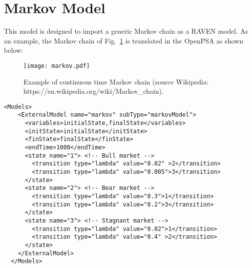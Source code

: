 \section{Markov Model}
\label{sec:MarkovModel}

This model is designed to import a generic Markov chain as a RAVEN model.
As an example, the Markov chain of Fig.~\ref{fig:markov} is translated in the OpenPSA as shown below:

\begin{figure}
    \centering
    \centerline{\texttt{[image: markov.pdf]}} 
    \caption{Example of continuous time Markov chain (source Wikipedia: https://en.wikipedia.org/wiki/Markov\_chain).}
    \label{fig:markov}
\end{figure}

\begin{lstlisting}[style=XML,morekeywords={anAttribute},caption=Markov model input example., label=lst:Markov_InputExample]
  <Models>
    <ExternalModel name="markov" subType="markovModel">
      <variables>initialState,finalState</variables>
      <initState>initialState</initState>
      <finState>finalState</finState>
      <endTime>1000</endTime>
      <state name="1"> <!-- Bull market -->
        <transition type="lambda" value="0.02" >2</transition>
        <transition type="lambda" value="0.005">3</transition>
      </state>
      <state name="2"> <!-- Bear market -->
        <transition type="lambda" value="0.3">1</transition>
        <transition type="lambda" value="0.2">3</transition>
      </state>
      <state name="3"> <!-- Stagnant market -->
        <transition type="lambda" value="0.02">1</transition>
        <transition type="lambda" value="0.4" >2</transition>
      </state>      
    </ExternalModel>
  </Models>
\end{lstlisting}

